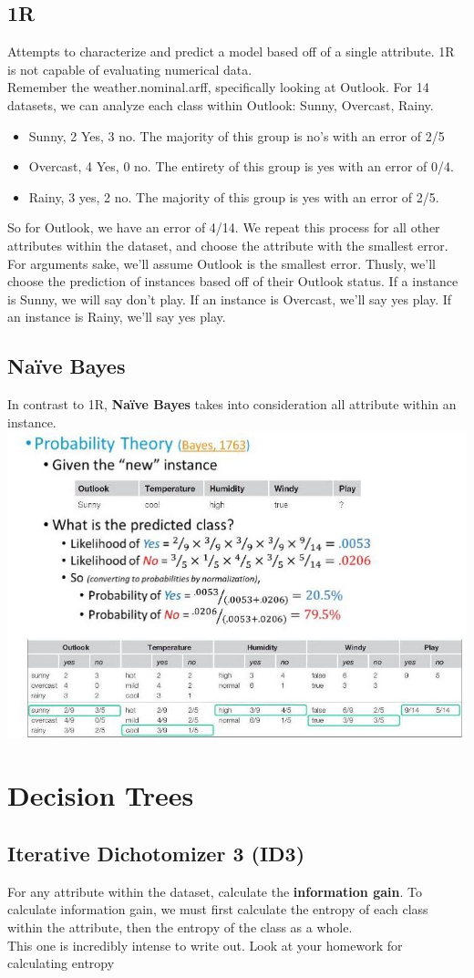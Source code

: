 \documentclass{article}
\begin{document}
\subsection{1R}
Attempts to characterize and predict a model based off of a single attribute. 1R is not capable of evaluating numerical data. \\
Remember the weather.nominal.arff, specifically looking at Outlook. For 14 datasets, we can analyze each class within Outlook: Sunny, Overcast, Rainy.
\begin{itemize}
	\item Sunny, 2 Yes, 3 no. The majority of this group is no's with an error of 2/5
	\item Overcast, 4 Yes, 0 no. The entirety of this group is yes with an error of 0/4.
	\item Rainy, 3 yes, 2 no. The majority of this group is yes with an error of 2/5.
\end{itemize}
So for Outlook, we have an error of 4/14. We repeat this process for all other attributes within the dataset, and choose the attribute with the smallest error. For arguments sake, we'll assume Outlook is the smallest error. Thusly, we'll choose the prediction of instances based off of their Outlook status. If a instance is Sunny, we will say don't play. If an instance is Overcast, we'll say yes play. If an instance is Rainy, we'll say yes play.
\subsection{Na\"ive Bayes}
In contrast to 1R, \textbf{Na\"ive Bayes} takes into consideration all attribute within an instance.\\
\includegraphics[scale=0.5]{pics/naivebayes.png}
\section{Decision Trees}
\subsection{Iterative Dichotomizer 3 (ID3)}
For any attribute within the dataset, calculate the \textbf{information gain}. To calculate information gain, we must first calculate the entropy of each class within the attribute, then the entropy of the class as a whole.\\
This one is incredibly intense to write out. Look at your homework for calculating entropy
\end{document}
